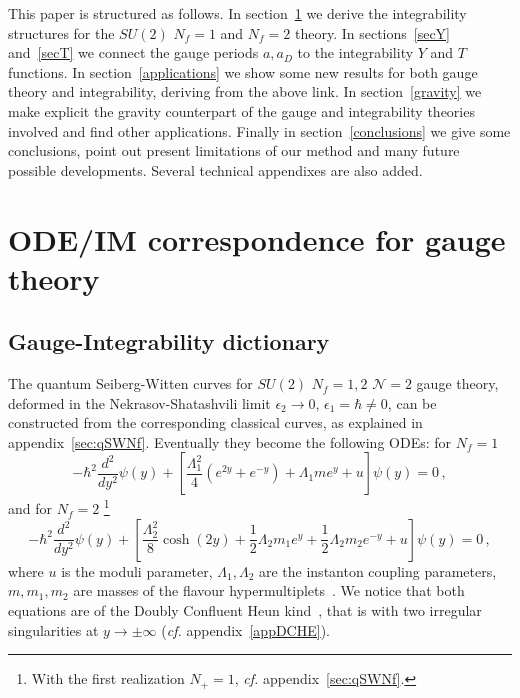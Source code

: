\documentclass[11pt,a4paper]{elsarticle}
\newcommand{\be}{\begin{equation}}
\newcommand{\ee}{\end{equation}}
\numberwithin{figure}{section}
\numberwithin{table}{section}
\begin{document}
This paper is structured as follows. In section~\ref{ODE/IM} we derive the integrability structures for the $SU(2)$ $N_f=1$ and $N_f=2$ theory. In sections~\ref{secY} and~\ref{secT} we connect the gauge periods $a,a_D$ to the integrability $Y$ and $T$ functions. In section~\ref{applications} we show some new results for both gauge theory and integrability, deriving from the above link. In section~\ref{gravity} we make explicit the gravity counterpart of the gauge and integrability theories involved and find other applications. Finally in section~\ref{conclusions} we give some conclusions, point out present limitations of our method and many future possible developments. Several technical appendixes are also added.

\section{ODE/IM correspondence for gauge theory} \label{ODE/IM}

\subsection{Gauge-Integrability dictionary}

The quantum Seiberg-Witten curves for $SU(2)$ $N_f=1,2$ $\mathcal{N}=2$ gauge theory, deformed in the Nekrasov-Shatashvili limit $\epsilon_2 \to 0$, $\epsilon_1 = \hbar \neq 0$, can be constructed from the corresponding classical curves, as explained in appendix~\ref{sec:qSWNf}. Eventually they become the following ODEs: for $N_f=1$ 
\be \label{ODEgau1}
-\hbar^2 \frac{d^2}{dy^2} \psi(y) + \left[ \frac{\Lambda_1^2}{4} (e^{2y}+e^{-y}) + \Lambda_1 m e^y + u\right] \psi(y) = 0\,,
\ee 
and for $N_f=2$ \footnote{With the first realization $N_+=1$, \textit{cf.} appendix~\ref{sec:qSWNf}.}
\be  \label{ODEgau2}
-\hbar^2 \frac{d^2}{dy^2} \psi(y) + \left[ \frac{\Lambda_2^2}{8} \cosh(2y) + \frac{1}{2}\Lambda_2 m_1 e^y + \frac{1}{2}\Lambda_2 m_2 e^{-y} + u\right] \psi(y) = 0\,,
\ee
where $u$ is the moduli parameter, $\Lambda_1,\Lambda_2$ are the instanton coupling parameters, $m,m_1,m_2$ are masses of the flavour hypermultiplets~\cite{ItoKannoOkubo:2017}. We notice that both equations are of the Doubly Confluent Heun kind~\cite{Ronveaux:1995}, that is with two irregular singularities at $y \to \pm \infty$ (\textit{cf.} appendix~\ref{appDCHE}). 
\end{document}
